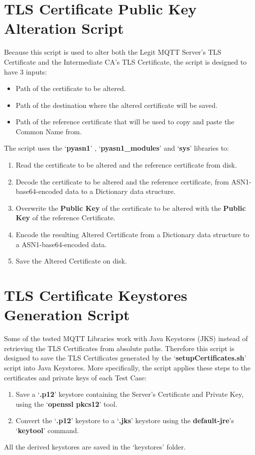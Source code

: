 \documentclass[binding=0.6cm,noexaminfo]{sapthesis}
\begin{document}
\section{TLS Certificate Public Key Alteration Script}

Because this script is used to alter both the Legit MQTT Server's TLS Certificate and the Intermediate CA's TLS Certificate, the script is designed to have 3 inputs:
\begin{itemize}
	\item Path of the certificate to be altered.
	\item Path of the destination where the altered certificate will be saved.
	\item Path of the reference certificate that will be used to copy and paste the Common Name from.
\end{itemize}
The script uses the `\textbf{pyasn1}' , `\textbf{pyasn1\_modules}' and `\textbf{sys}' libraries to:
\begin{enumerate}
	\item Read the certificate to be altered and the reference certificate from disk.
	\item Decode the certificate to be altered and the reference certificate, from ASN1-base64-encoded data to a Dictionary data structure.
	\item Overwrite the \textbf{Public Key} of the certificate to be altered with the \textbf{Public Key} of the reference Certificate.
	\item Encode the resulting Altered Certificate from a Dictionary data structure to a ASN1-base64-encoded data.
	\item Save the Altered Certificate on disk.
\end{enumerate}

\section{TLS Certificate Keystores Generation Script}

Some of the tested MQTT Libraries work with Java Keystores (JKS) instead of retrieving the TLS Certificates from absolute paths. Therefore this script is designed to save the TLS Certificates generated by the `\textbf{setupCertificates.sh}' script into Java Keystores.
More specifically, the script applies these steps to the certificates and private keys of each Test Case:
\begin{enumerate}
	\item Save a `\textbf{.p12}' keystore containing the Server's Certificate and Private Key, using the `\textbf{openssl pkcs12}' tool.
	\item Convert the `\textbf{.p12}' keystore to a `\textbf{.jks}' keystore using the \textbf{default-jre}'s `\textbf{keytool}' command.
\end{enumerate}
All the derived keystores are saved in the `keystores' folder.
\end{document}
